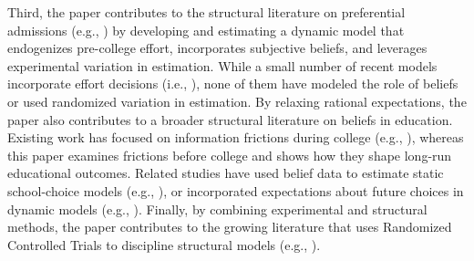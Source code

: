 Third, the paper contributes to the structural literature on preferential admissions (e.g., \citealp{arcidiacono2005affirmative,kapor2024transparency,otero2023affirmative}) by developing and estimating a dynamic model that endogenizes pre-college effort, incorporates subjective beliefs, and leverages experimental variation in estimation. While a small number of recent models incorporate effort decisions (i.e., \citealp{hickman2024pre,grau2018impact,borghesan2022heterogeneous}), none of them have modeled the role of beliefs or used randomized variation in estimation. By relaxing rational expectations, the paper also contributes to a broader structural literature on beliefs in education. Existing work has focused on information frictions during college (e.g., \citealp{stinebrickner2014major,wiswall2015determinants, arcidiacono2020ex}), whereas this paper examines frictions before college and shows how they shape long-run educational outcomes. Related studies have used belief data to estimate static school-choice models (e.g., \citealp{bobba2025perceived, kapor2020heterogeneous}), or incorporated expectations about future choices in dynamic models (e.g., \citealp{van2012use, delavande2019university}). Finally, by combining experimental and structural methods, the paper contributes to the growing literature that uses Randomized Controlled Trials to discipline structural models (e.g., \citealp{todd2006assessing,todd2020best,attanasio2011education}).





